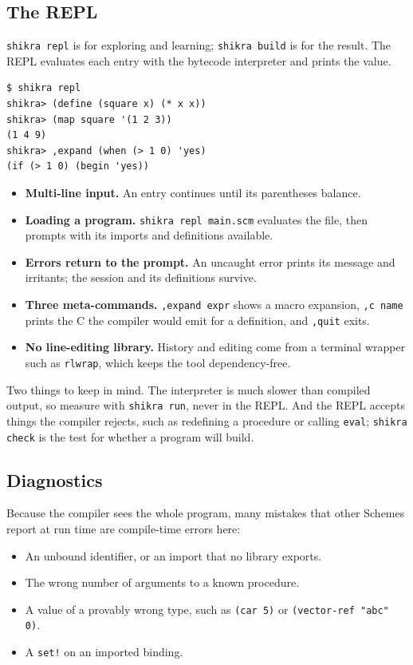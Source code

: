 \documentclass[a4paper,11pt]{article}
\begin{document}
\subsection{The REPL}

\texttt{shikra repl} is for exploring and learning; \texttt{shikra build} is
for the result. The REPL evaluates each entry with the bytecode interpreter
and prints the value.

\begin{verbatim}
$ shikra repl
shikra> (define (square x) (* x x))
shikra> (map square '(1 2 3))
(1 4 9)
shikra> ,expand (when (> 1 0) 'yes)
(if (> 1 0) (begin 'yes))
\end{verbatim}

\begin{itemize}
\item \textbf{Multi-line input.} An entry continues until its parentheses
  balance.
\item \textbf{Loading a program.} \texttt{shikra repl main.scm} evaluates
  the file, then prompts with its imports and definitions available.
\item \textbf{Errors return to the prompt.} An uncaught error prints its
  message and irritants; the session and its definitions survive.
\item \textbf{Three meta-commands.} \texttt{,expand expr} shows a macro
  expansion, \texttt{,c name} prints the C the compiler would emit for a
  definition, and \texttt{,quit} exits.
\item \textbf{No line-editing library.} History and editing come from a
  terminal wrapper such as \texttt{rlwrap}, which keeps the tool
  dependency-free.
\end{itemize}

Two things to keep in mind. The interpreter is much slower than compiled
output, so measure with \texttt{shikra run}, never in the REPL. And the REPL
accepts things the compiler rejects, such as redefining a procedure or
calling \texttt{eval}; \texttt{shikra check} is the test for whether a
program will build.

\subsection{Diagnostics}

Because the compiler sees the whole program, many mistakes that other
Schemes report at run time are compile-time errors here:

\begin{itemize}
\item An unbound identifier, or an import that no library exports.
\item The wrong number of arguments to a known procedure.
\item A value of a provably wrong type, such as \texttt{(car 5)} or
  \texttt{(vector-ref "abc" 0)}.
\item A \texttt{set!} on an imported binding.
\end{itemize}
\end{document}
